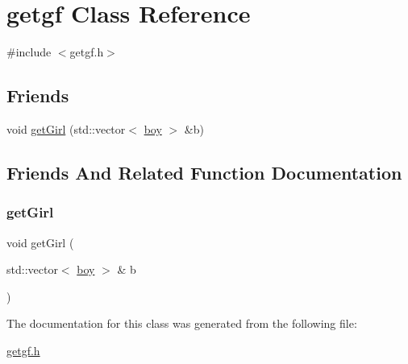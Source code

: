 \hypertarget{classgetgf}{}\section{getgf Class Reference}
\label{classgetgf}


{\ttfamily \#include $<$getgf.\+h$>$}

\subsection*{Friends}
\begin{DoxyCompactItemize}
\item 
void \hyperlink{classgetgf_a1ca07cd41f0f09642e9982bd209133ce}{get\+Girl} (std\+::vector$<$ \hyperlink{classboy}{boy} $>$ \&b)
\end{DoxyCompactItemize}


\subsection{Friends And Related Function Documentation}
\mbox{\label{classgetgf_a1ca07cd41f0f09642e9982bd209133ce}} 
\subsubsection{\texorpdfstring{get\+Girl}{getGirl}}
{\footnotesize\ttfamily void get\+Girl (\begin{DoxyParamCaption}\item[{std\+::vector$<$ \hyperlink{classboy}{boy} $>$ \&}]{b }\end{DoxyParamCaption})\hspace{0.3cm}{\ttfamily [friend]}}



The documentation for this class was generated from the following file\+:\begin{DoxyCompactItemize}
\item 
\hyperlink{getgf_8h}{getgf.\+h}\end{DoxyCompactItemize}
